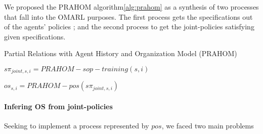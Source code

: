 \documentclass[runningheads]{llncs}
\begin{document}

We proposed the PRAHOM algorithm\autoref{alg:prahom} as a synthesis of two processes that fall into the OMARL purposes. The first process gets the specifications out of the agents' policies ; and the second process to get the joint-policies satisfying given specifications.


\begin{algorithm}[hbt!]
    \caption{Partial Relations with Agent History and Organization Model (PRAHOM)}\label{alg:prahom}



    $s\pi_{joint,s,i} = PRAHOM-sop-training(s,i)$

    $os_{s,i} = PRAHOM-pos(s\pi_{joint,s,i})$

\end{algorithm}

\paragraph{\textbf{Infering OS from joint-policies}}

Seeking to implement a process represented by $pos$, we faced two main problems
\end{document}
